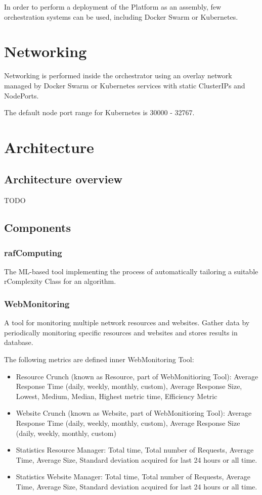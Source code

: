 In order to perform a deployment of the Platform as an assembly, few orchestration systems can be used, including Docker Swarm or Kubernetes.

\section{Networking}

Networking is performed inside the orchestrator using an overlay network managed by Docker Swarm or Kubernetes services with static ClusterIPs and NodePorts.

The default node port range for Kubernetes is 30000 - 32767.


\section{Architecture}

\subsection{Architecture overview}

TODO

\subsection{Components}

\subsubsection{rafComputing}
The ML-based tool implementing the process of automatically tailoring a suitable rComplexity Class for an algorithm.

\subsubsection{WebMonitoring}
A tool for monitoring multiple network resources and websites. 
Gather data by periodically monitoring specific resources and websites and stores results in database.

The following metrics are defined inner WebMonitoring Tool:
\begin{itemize}
	\item Resource Crunch (known as Resource, part of WebMonitioring Tool): Average Response Time (daily, weekly, monthly, custom), Average Response Size, Lowest, Medium, Median, Highest metric time, Efficiency Metric	
	\item Website Crunch (known as Website, part of WebMonitioring Tool): Average Response Time (daily, weekly, monthly, custom), Average Response Size (daily, weekly, monthly, custom)
	\item Statistics Resource Manager: Total time, Total number of Requests, Average Time, Average Size, Standard deviation acquired for last 24 hours or all time.
	\item Statistics Website Manager: Total time, Total number of Requests, Average Time, Average Size, Standard deviation acquired for last 24 hours or all time.
\end{itemize}

